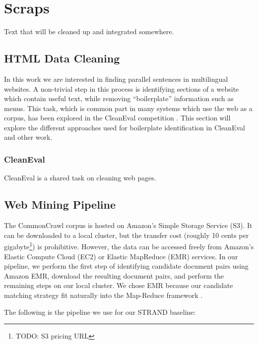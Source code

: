 \chapter{Scraps}
Text that will be cleaned up and integrated somewhere.

\section{HTML Data Cleaning}
In this work we are interested in finding parallel sentences in multilingual
websites. A non-trivial step in this process is identifying sections of a website
which contain useful text, while removing ``boilerplate'' information such as
menus. This task, which is common part in many systems which use the web as a
corpus, has been explored in the CleanEval competition \citep{CleanEval}. This
section will explore the different approaches used for boilerplate
identification in CleanEval and other work.

\subsection{CleanEval}
CleanEval \citep{CleanEval} is a shared task on cleaning web pages. 

\section{Web Mining Pipeline}

The CommonCrawl corpus is hosted on Amazon's Simple Storage Service (S3). It can
be downloaded to a local cluster, but the transfer cost (roughly 10 cents per
gigabyte\footnote{TODO: S3 pricing URL}) is prohibitive. However, the data can be
accessed freely from Amazon's Elastic Compute Cloud (EC2) or Elastic MapReduce
(EMR) services. In our pipeline, we perform the first step of identifying
candidate document pairs using Amazon EMR, download the resulting document
pairs, and perform the remaining steps on our local cluster. We chose EMR
because our candidate matching strategy fit naturally into the Map-Reduce
framework \citep{Dean04}.

The following is the pipeline we use for our STRAND \citep{Resnik03} baseline:

